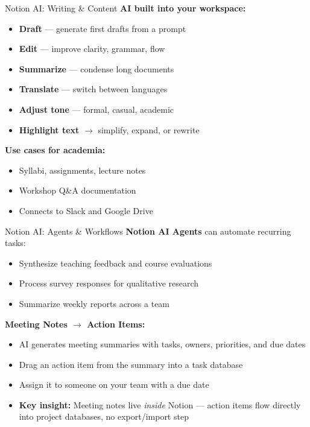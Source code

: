 \documentclass[aspectratio=169]{beamer}
\begin{document}
\begin{frame}{Notion AI: Writing \& Content}
    \textbf{AI built into your workspace:}
    \begin{itemize}
        \item \textbf{Draft} --- generate first drafts from a prompt
        \item \textbf{Edit} --- improve clarity, grammar, flow
        \item \textbf{Summarize} --- condense long documents
        \item \textbf{Translate} --- switch between languages
        \item \textbf{Adjust tone} --- formal, casual, academic
        \item \textbf{Highlight text} $\rightarrow$ simplify, expand, or rewrite
    \end{itemize}

    \vspace{1em}
    \textbf{Use cases for academia:}
    \begin{itemize}
        \item Syllabi, assignments, lecture notes
        \item Workshop Q\&A documentation
        \item Connects to Slack and Google Drive
    \end{itemize}
\end{frame}

\begin{frame}{Notion AI: Agents \& Workflows}
    \textbf{Notion AI Agents} can automate recurring tasks:
    \begin{itemize}
        \item Synthesize teaching feedback and course evaluations
        \item Process survey responses for qualitative research
        \item Summarize weekly reports across a team
    \end{itemize}

    \vspace{1em}
    \textbf{Meeting Notes $\rightarrow$ Action Items:}
    \begin{itemize}
        \item AI generates meeting summaries with tasks, owners, priorities, and due dates
        \item Drag an action item from the summary into a task database
        \item Assign it to someone on your team with a due date
        \item \textbf{Key insight:} Meeting notes live \textit{inside} Notion --- action items flow directly into project databases, no export/import step
    \end{itemize}
\end{frame}
\end{document}
